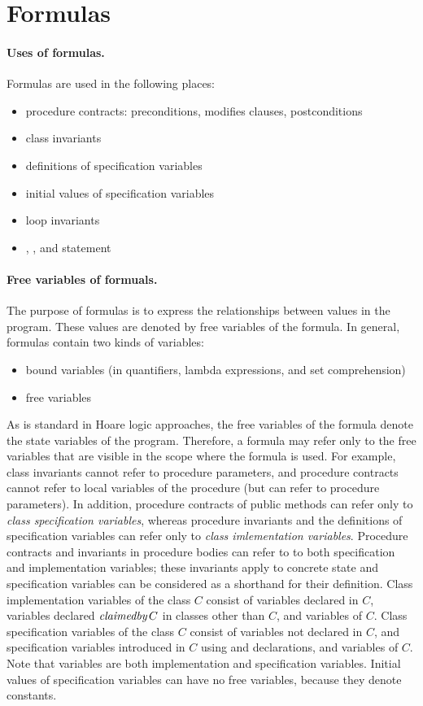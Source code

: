 \section{Formulas}

\paragraph{Uses of formulas.}
Formulas are used in the following places:
\begin{itemize}
\item procedure contracts: preconditions, modifies clauses, postconditions
\item class invariants
\item definitions of specification variables
\item initial values of specification variables
\item loop invariants
\item {}, , and  statement
\end{itemize}

\paragraph{Free variables of formuals.}
The purpose of formulas is to express the relationships between values
in the program.  These values are denoted by free variables of the
formula.  In general, formulas contain two kinds of variables:
\begin{itemize}
\item bound variables (in quantifiers, lambda expressions, and set
comprehension)
\item free variables
\end{itemize}
As is standard in Hoare logic approaches, the free variables of the
formula denote the state variables of the program.  Therefore, a
formula may refer only to the free variables that are visible in the
scope where the formula is used.  For example, class invariants cannot
refer to procedure parameters, and procedure contracts cannot refer to
local variables of the procedure (but can refer to procedure
parameters).  In addition, procedure contracts of public methods can refer only to
\emph{class specification variables}, whereas procedure invariants and
the definitions of specification variables can refer only to
\emph{class imlementation variables}.  Procedure contracts and invariants in procedure bodies
can refer to to both specification and implementation variables; these
invariants apply to concrete state and specification variables can be
considered as a shorthand for their definition.  Class implementation
variables of the class $C$ consist of variables declared 
in $C$, variables declared $\textit{claimedby}\, C$ in classes other than
$C$, and
 variables of $C$.  Class specification variables of the
class $C$ consist of variables not declared  in $C$, and
specification variables introduced in $C$ using  and
 declarations, and  variables of $C$.
Note that  variables are both implementation and
specification variables.  Initial values of specification variables
can have no free variables, because they denote constants.

